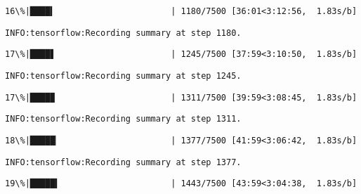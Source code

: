 \documentclass[11pt]{article}
\begin{document}
    \begin{Verbatim}[commandchars=\\\{\}]
 16\%|████▍                       | 1180/7500 [36:01<3:12:56,  1.83s/b]
    \end{Verbatim}

    \begin{Verbatim}[commandchars=\\\{\}]
INFO:tensorflow:Recording summary at step 1180.

    \end{Verbatim}

    \begin{Verbatim}[commandchars=\\\{\}]
 17\%|████▋                       | 1245/7500 [37:59<3:10:50,  1.83s/b]
    \end{Verbatim}

    \begin{Verbatim}[commandchars=\\\{\}]
INFO:tensorflow:Recording summary at step 1245.

    \end{Verbatim}

    \begin{Verbatim}[commandchars=\\\{\}]
 17\%|████▉                       | 1311/7500 [39:59<3:08:45,  1.83s/b]
    \end{Verbatim}

    \begin{Verbatim}[commandchars=\\\{\}]
INFO:tensorflow:Recording summary at step 1311.

    \end{Verbatim}

    \begin{Verbatim}[commandchars=\\\{\}]
 18\%|█████▏                      | 1377/7500 [41:59<3:06:42,  1.83s/b]
    \end{Verbatim}

    \begin{Verbatim}[commandchars=\\\{\}]
INFO:tensorflow:Recording summary at step 1377.

    \end{Verbatim}

    \begin{Verbatim}[commandchars=\\\{\}]
 19\%|█████▍                      | 1443/7500 [43:59<3:04:38,  1.83s/b]
    \end{Verbatim}
\end{document}
